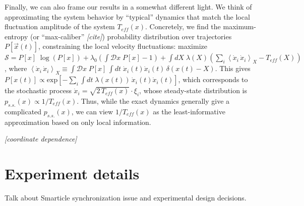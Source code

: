 \documentclass[11pt]{article}
\renewcommand{\v}[1]{\ensuremath{\vec{#1}}} %
\renewcommand{\=}[1]{\stackrel{#1}{=}} %
\renewcommand{\(}{\left (}
\renewcommand{\)}{\right  )}
\renewcommand{\[}{\left [}
\renewcommand{\]}{\right ]}
\newcommand{\<}{\left <}
\renewcommand{\>}{\right >}
\theoremstyle{definition}
\theoremstyle{remark}
\renewcommand{\exp}[1]{\mbox{exp}\[#1\]} %
\renewcommand{\todo}[1]{\textit{\color{red}[#1]}}
\begin{document}
Finally, we can also frame our results in a somewhat different light. We think of approximating the system behavior by ``typical'' dynamics that match the local fluctuation amplitude of the system $ T_{eff}(x) $. Concretely, we find the maximum-entropy (or ``max-caliber'' \todo{cite}) probability distribution over trajectories $ P[\v{x}(t)] $, constraining the local velocity fluctuations: maximize $ \mathcal{S} = P[x] \;\log\(P[x]\) + \lambda_0 \( \int \mathcal{D} x \;P[x] - 1\) + \int dX \; \lambda(X) \(\sum _i \< \dot{x}_i\,\dot{x}_i\> _X - T_{eff}(X)\)$, where $ \< \dot{x}_i\, \dot{x}_i\> _X \equiv \int \mathcal{D}x \; P[x] \,\int dt \; \dot{x}_i(t) \dot{x}_i(t) \,\delta(x(t) - X) $. This gives $ P[x(t)] \propto \exp{-\sum_i \int dt \; \lambda(x(t))\,\dot{x}_i(t)\dot{x}_i(t)} $, which corresponds to the stochastic process $ \dot{x}_i = \sqrt{2\,T_{eff}(x)}\cdot \xi_i$, whose steady-state distribution is $ p_{s.s.}(x)\propto 1/T_{eff}(x) $. Thus, while the exact dynamics generally give a complicated $ p_{s.s.}(x) $, we can view $1/T_{eff}(x) $ as the least-informative approximation based on only local information.

\todo{coordinate dependence}









\appendix
\renewcommand{\thesection}{\Alph{section}} 
\section{Experiment details}
Talk about Smarticle synchronization issue and experimental design decisions.
\end{document}
